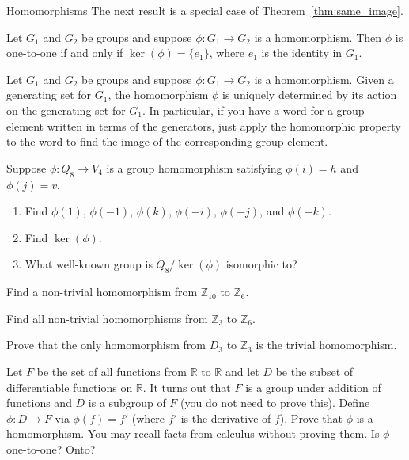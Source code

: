 \begin{section}{Homomorphisms}
The next result is a special case of Theorem~\ref{thm:same_image}.

\begin{theorem}\label{thm:trivial_kernel}
Let $G_1$ and $G_2$ be groups and suppose $\phi:G_1\to G_2$ is a homomorphism. Then $\phi$ is one-to-one if and only if $\ker(\phi)=\{e_1\}$, where $e_1$ is the identity in $G_1$.
\end{theorem}

Let $G_1$ and $G_2$ be groups and suppose $\phi:G_1\to G_2$ is a homomorphism. Given a generating set for $G_1$, the homomorphism $\phi$ is uniquely determined by its action on the generating set for $G_1$.  In particular, if you have a word for a group element written in terms of the generators, just apply the homomorphic property to the word to find the image of the corresponding group element.

\begin{problem}\label{prob:Q8toV4}
Suppose $\phi: Q_8\to V_{4}$ is a group homomorphism satisfying $\phi(i)=h$ and $\phi(j)=v$.
\begin{enumerate}[label=\textrm{(\alph*)}]
\item Find $\phi(1)$, $\phi(-1)$, $\phi(k)$, $\phi(-i)$, $\phi(-j)$, and $\phi(-k)$.
\item Find $\ker(\phi)$.
\item What well-known group is $Q_8/\ker(\phi)$ isomorphic to?
\end{enumerate}
\end{problem}

\begin{problem}
Find a non-trivial homomorphism from $\mathbb{Z}_{10}$ to $\mathbb{Z}_6$.
\end{problem}

\begin{problem}
Find all non-trivial homomorphisms from $\mathbb{Z}_3$ to $\mathbb{Z}_6$.
\end{problem}

\begin{problem}
Prove that the only homomorphism from $D_3$ to $\mathbb{Z}_3$ is the trivial homomorphism.
\end{problem}

\begin{problem}
Let $F$ be the set of all functions from $\mathbb{R}$ to $\mathbb{R}$ and let $D$ be the subset of differentiable functions on $\mathbb{R}$.  It turns out that $F$ is a group under addition of functions and $D$ is a subgroup of $F$ (you do not need to prove this). Define $\phi:D\to F$ via $\phi(f)=f'$ (where $f'$ is the derivative of $f$). Prove that $\phi$ is a homomorphism.  You may recall facts from calculus without proving them. Is $\phi$ one-to-one? Onto? 
\end{problem}

\end{section}

